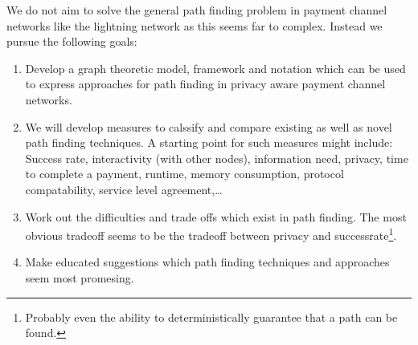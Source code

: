 \documentclass[a4paper]{paper}
\begin{document}
We do not aim to solve the general path finding problem in payment channel networks like the lightning network as this seems far to complex.
Instead we pursue the following goals:
\begin{enumerate}
\item Develop a graph theoretic model, framework and notation which can be used to express approaches for path finding in privacy aware payment channel networks.
\item We will develop measures to calssify and compare existing as well as novel path finding techniques. A starting point for such measures might include: Success rate, interactivity (with other nodes), information need, privacy, time to complete a payment, runtime, memory consumption, protocol compatability, service level agreement,\dots
\item Work out the difficulties and trade offs which exist in path finding. The most obvious tradeoff seems to be the tradeoff between privacy and successrate\footnote{Probably even the ability to deterministically guarantee that a path can be found.}.
\item Make educated suggestions which path finding techniques and approaches seem most promesing.
\end{enumerate}
\end{document}
